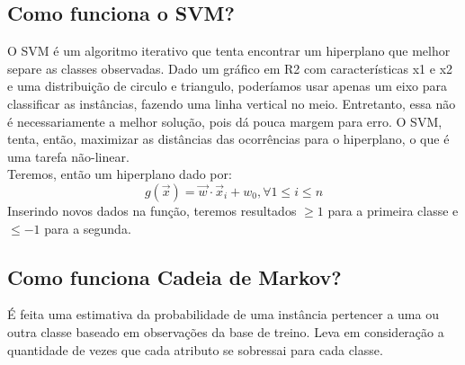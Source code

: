 \documentclass[12pt,a4paper]{article}
\begin{document}
    \subsection{Como funciona o SVM?}
    O SVM é um algoritmo iterativo que tenta encontrar um hiperplano que melhor separe as classes observadas.
    Dado um gráfico em R2 com características x1 e x2 e uma distribuição de circulo e triangulo,
    poderíamos usar apenas um eixo para classificar as instâncias, fazendo uma linha vertical no meio. Entretanto,
    essa não é necessariamente a melhor solução, pois dá pouca margem para erro. O SVM, tenta, então,
    maximizar as distâncias das ocorrências para o hiperplano, o que é uma tarefa não-linear.\\
    Teremos, então um hiperplano dado por:
    $$ g(\vec{x}) = \vec{w} \cdot \vec{x}_i + w_0 ,  \forall  1 \leq i \leq n  $$
    Inserindo novos dados na função, teremos resultados $\geq 1$ para a primeira classe e $\leq -1$ para a segunda.

    \subsection{Como funciona Cadeia de Markov?}
    É feita uma estimativa da probabilidade de uma instância pertencer a uma ou outra classe baseado em observações
    da base de treino. Leva em consideração a quantidade de vezes que cada atributo se sobressai para cada classe.
\end{document}

